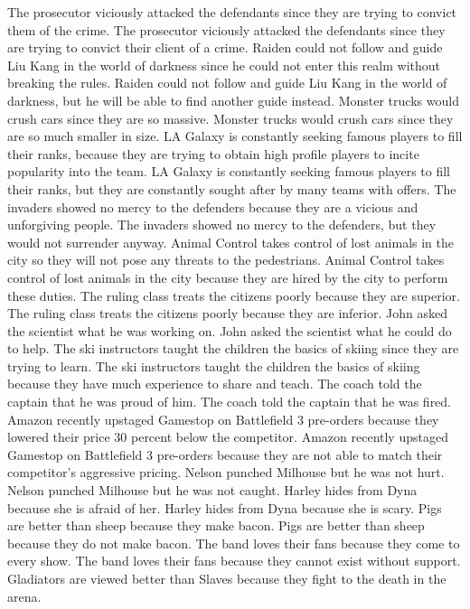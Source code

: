 \documentclass{article}
\begin{document}
\begin{enumerate}
	The prosecutor viciously attacked the defendants since they are trying to convict them of the crime.
	The prosecutor viciously attacked the defendants since they are trying to convict their client of a crime.
	Raiden could not follow and guide Liu Kang in the world of darkness since he could not enter this realm without breaking the rules.
	Raiden could not follow and guide Liu Kang in the world of darkness, but he will be able to find another guide instead.
	Monster trucks would crush cars since they are so massive.
	Monster trucks would crush cars since they are so much smaller in size.
	LA Galaxy is constantly seeking famous players to fill their ranks, because they are trying to obtain high profile players to incite popularity into the team.
	LA Galaxy is constantly seeking famous players to fill their ranks, but they are constantly sought after by many teams with offers.
	The invaders showed no mercy to the defenders because they are a vicious and unforgiving people.
	The invaders showed no mercy to the defenders, but they would not surrender anyway.
	Animal Control takes control of lost animals in the city so they will not pose any threats to the pedestrians.
	Animal Control takes control of lost animals in the city because they are hired by the city to perform these duties.
	The ruling class treats the citizens poorly because they are superior.
	The ruling class treats the citizens poorly because they are inferior.
	John asked the scientist what he was working on.
	John asked the scientist what he could do to help.
	The ski instructors taught the children the basics of skiing since they are trying to learn.
	The ski instructors taught the children the basics of skiing because they have much experience to share and teach.
	The coach told the captain that he was proud of him.
	The coach told the captain that he was fired.
	Amazon recently upstaged Gamestop on Battlefield 3 pre-orders because they lowered their price 30 percent below the competitor.
	Amazon recently upstaged Gamestop on Battlefield 3 pre-orders because they are not able to match their competitor's aggressive pricing.
	Nelson punched Milhouse but he was not hurt.
	Nelson punched Milhouse but he was not caught.
	Harley hides from Dyna because she is afraid of her.
	Harley hides from Dyna because she is scary.
	Pigs are better than sheep because they make bacon.
	Pigs are better than sheep because they do not make bacon.
	The band loves their fans because they come to every show.
	The band loves their fans because they cannot exist without support.
	Gladiators are viewed better than Slaves because they fight to the death in the arena.

\end{enumerate}
\end{document}
